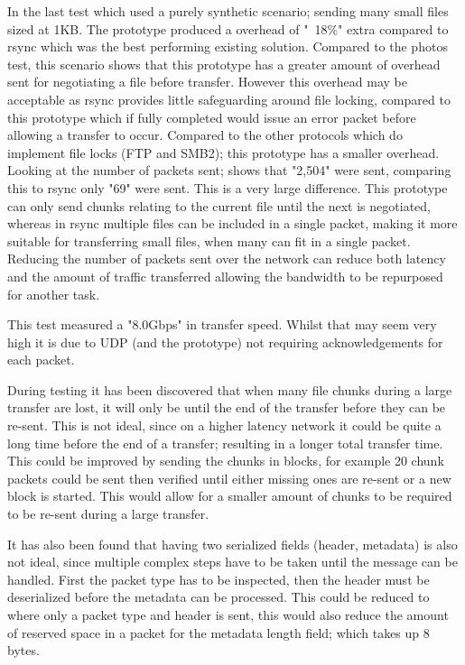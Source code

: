 In the last test which used a purely synthetic scenario; sending many small files sized at 1KB. The prototype produced a overhead of "~18\%" extra compared to rsync which was the best performing existing solution. Compared to the photos test, this scenario shows that this prototype has a greater amount of overhead sent for negotiating a file before transfer. However this overhead may be acceptable as rsync provides little safeguarding around file locking, compared to this prototype which if fully completed would issue an error packet before allowing a transfer to occur. Compared to the other protocols which do implement file locks (FTP and SMB2); this prototype has a smaller overhead. Looking at the number of packets sent; shows that "2,504" were sent, comparing this to rsync only "69" were sent. This is a very large difference. This prototype can only send chunks relating to the current file until the next is negotiated, whereas in rsync multiple files can be included in a single packet, making it more suitable for transferring small files, when many can fit in a single packet. Reducing the number of packets sent over the network can reduce both latency and the amount of traffic transferred allowing the bandwidth to be repurposed for another task.

This test measured a "8.0Gbps" in transfer speed. Whilst that may seem very high it is due to UDP (and the prototype) not requiring acknowledgements for each packet.

During testing it has been discovered that when many file chunks during a large transfer are lost, it will only be until the end of the transfer before they can be re-sent. This is not ideal, since on a higher latency network it could be quite a long time before the end of a transfer; resulting in a longer total transfer time. This could be improved by sending the chunks in blocks, for example 20 chunk packets could be sent then verified until either missing ones are re-sent or a new block is started. This would allow for a smaller amount of chunks to be required to be re-sent during a large transfer.

It has also been found that having two serialized fields (header, metadata) is also not ideal, since multiple complex steps have to be taken until the message can be handled. First the packet type has to be inspected, then the header must be deserialized before the metadata can be processed. This could be reduced to where only a packet type and header is sent, this would also reduce the amount of reserved space in a packet for the metadata length field; which takes up 8 bytes.


